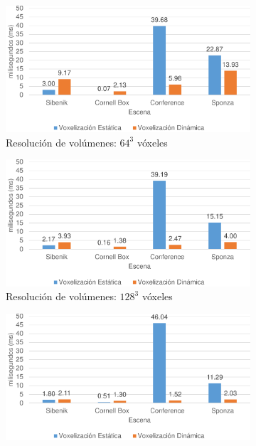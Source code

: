 \begin{figure}[H]
	\centering
	\begin{subfigure}{.49\textwidth}
		\centering
		\includegraphics[width=\linewidth]{media/voxelzation_64_cropped.pdf}
		\caption*{Resolución de volúmenes: $64^3$ vóxeles}
	\end{subfigure}
	\begin{subfigure}{.49\textwidth}
		\centering
		\includegraphics[width=\linewidth]{media/voxelzation_128_cropped.pdf}	
		\caption*{Resolución de volúmenes: $128^3$ vóxeles}
	\end{subfigure}
	\par\bigskip
	\begin{subfigure}{.49\textwidth}
		\centering
		\includegraphics[width=\linewidth]{media/voxelzation_256_cropped.pdf}

\end{subfigure}
\end{figure}
